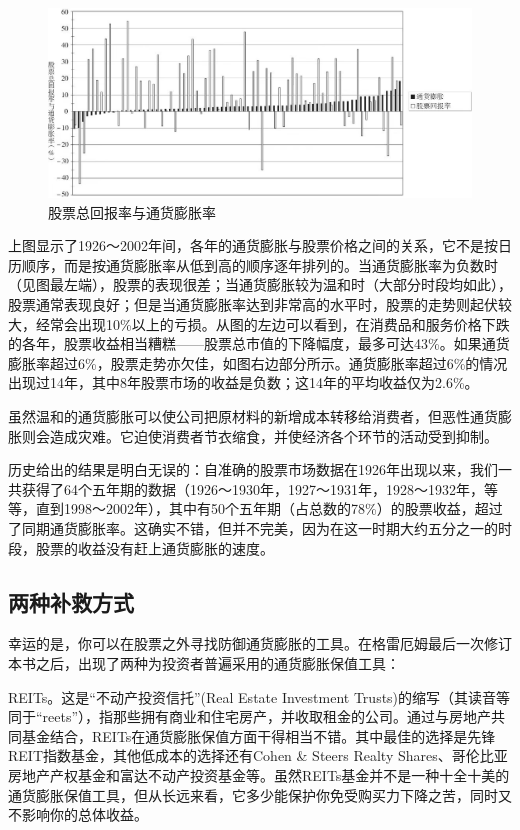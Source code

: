 \documentclass[12pt,oneside]{book}
\begin{document}
\begin{figure}[H]
\centering
\includegraphics[width=\linewidth ,totalheight=0.95\textheight , keepaspectratio]{股票总回报率与通货膨胀率.jpg}
\caption{股票总回报率与通货膨胀率}
\end{figure}

上图显示了1926～2002年间，各年的通货膨胀与股票价格之间的关系，它不是按日历顺序，而是按通货膨胀率从低到高的顺序逐年排列的。当通货膨胀率为负数时（见图最左端），股票的表现很差；当通货膨胀较为温和时（大部分时段均如此），股票通常表现良好；但是当通货膨胀率达到非常高的水平时，股票的走势则起伏较大，经常会出现10\%以上的亏损。从图的左边可以看到，在消费品和服务价格下跌的各年，股票收益相当糟糕——股票总市值的下降幅度，最多可达43\%。如果通货膨胀率超过6\%，股票走势亦欠佳，如图右边部分所示。通货膨胀率超过6\%的情况出现过14年，其中8年股票市场的收益是负数；这14年的平均收益仅为2.6\%。

虽然温和的通货膨胀可以使公司把原材料的新增成本转移给消费者，但恶性通货膨胀则会造成灾难。它迫使消费者节衣缩食，并使经济各个环节的活动受到抑制。

历史给出的结果是明白无误的：自准确的股票市场数据在1926年出现以来，我们一共获得了64个五年期的数据（1926～1930年，1927～1931年，1928～1932年，等等，直到1998～2002年），其中有50个五年期（占总数的78\%）的股票收益，超过了同期通货膨胀率。这确实不错，但并不完美，因为在这一时期大约五分之一的时段，股票的收益没有赶上通货膨胀的速度。

\subsection{两种补救方式}
幸运的是，你可以在股票之外寻找防御通货膨胀的工具。在格雷厄姆最后一次修订本书之后，出现了两种为投资者普遍采用的通货膨胀保值工具：

REITs。这是“不动产投资信托”(Real Estate Investment Trusts)的缩写（其读音等同于“reets”），指那些拥有商业和住宅房产，并收取租金的公司。通过与房地产共同基金结合，REITs在通货膨胀保值方面干得相当不错。其中最佳的选择是先锋REIT指数基金，其他低成本的选择还有Cohen \& Steers Realty Shares、哥伦比亚房地产产权基金和富达不动产投资基金等。虽然REITs基金并不是一种十全十美的通货膨胀保值工具，但从长远来看，它多少能保护你免受购买力下降之苦，同时又不影响你的总体收益。
\end{document}
